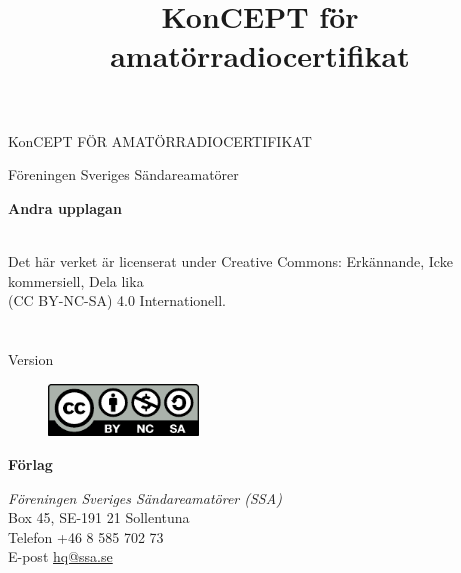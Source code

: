 \onecolumn{}
\vspace{10em}
\title{KonCEPT för amatörradiocertifikat}
\begin{center}
\Large{KonCEPT FÖR AMATÖRRADIOCERTIFIKAT}

Föreningen Sveriges Sändareamatörer\\[2\baselineskip]
\end{center}


\noindent \textbf{Andra upplagan}

\noindent
\\
\noindent Det här verket är licenserat under Creative Commons:\newline
\noindent Erkännande, Icke kommersiell, Dela lika\\
\noindent (CC BY-NC-SA) 4.0 Internationell.\\
\\
\\
\noindent Version \revision

\begin{figure}[h]
    \includegraphics[width=4cm]{images/cc-by-nc-sa}
\end{figure}


\vfill

\noindent
\textbf{Förlag}

\noindent
\textit{Föreningen Sveriges Sändareamatörer (SSA)}\\
Box 45, SE-191 21 Sollentuna\\
Telefon +46 8 585 702 73\\
E-post \href{mailto:hq@ssa.se}{hq@ssa.se}\\[\baselineskip]
\restoregeometry\twocolumn